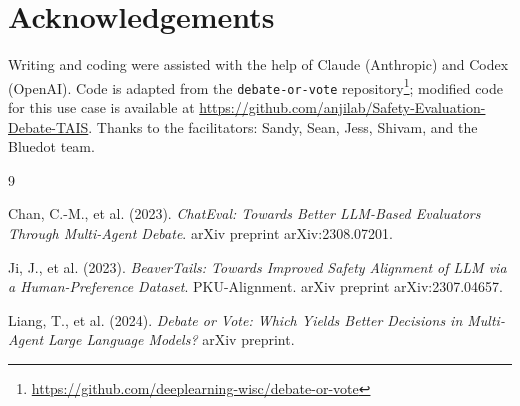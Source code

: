 \documentclass[11pt,a4paper]{article}
\begin{document}
\section*{Acknowledgements}

Writing and coding were assisted with the help of Claude (Anthropic) and Codex (OpenAI). Code is adapted from the \texttt{debate-or-vote} repository\footnote{\url{https://github.com/deeplearning-wisc/debate-or-vote}}; modified code for this use case is available at \url{https://github.com/anjilab/Safety-Evaluation-Debate-TAIS}. Thanks to the facilitators: Sandy, Sean, Jess, Shivam, and the Bluedot team.

\begin{thebibliography}{9}

Chan, C.-M., et al. (2023).
\textit{ChatEval: Towards Better LLM-Based Evaluators Through Multi-Agent Debate}.
arXiv preprint arXiv:2308.07201.

Ji, J., et al. (2023).
\textit{BeaverTails: Towards Improved Safety Alignment of LLM via a Human-Preference Dataset}.
PKU-Alignment. arXiv preprint arXiv:2307.04657.

Liang, T., et al. (2024).
\textit{Debate or Vote: Which Yields Better Decisions in Multi-Agent Large Language Models?}
arXiv preprint.

\end{thebibliography}
\end{document}
